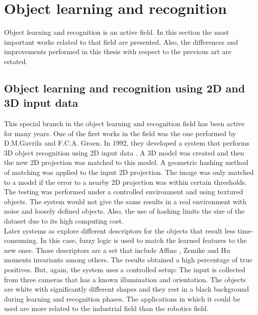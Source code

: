 \section{Object learning and recognition}

Object learning and recognition is an active field. 
In this section the most important works related to that field are presented. 
Also, the differences and improvements performed in this thesis with respect to the previous art are estated. 

\subsection{Object learning and recognition using 2D and 3D input data}

This special branch in the object learning and recognition field has been active for many years. 
One of the first works in the field was the one performed by D.M.Gavrila and F.C.A. Groen. 
In 1992,  they developed a  system that performs 3D object recognition using 2D input data \cite{D.M.Gavrila1991}.
A 3D model was created and then the new 2D projection was matched to this model.
A geometric hashing method of matching was applied to the input 2D projection. 
The image was only matched to a model if the error to a nearby 2D projection was within certain thresholds.
The testing was performed under a controlled environment and using textured objects. 
The system would not give the same results in a real environment with noise and loosely defined objects. 
Also, the use of hashing limits the size of the dataset due to its high computing cost. 
\\

Later systems as \cite{Sheta2012} explore different descriptors for the objects that result less time-consuming. 
In this case, fuzzy logic is used to match the learned features to the new ones. 
Those descriptors are a set that include Affine \cite{Reiss:1991:RFT:117668.117680}, Zemike \cite{Teague} and Hu \cite{Hu1962} moments invariants among others. 
The results obtained a high percentage of true positives. 
But, again, the system uses a controlled setup:
The input is collected from three cameras that has a known illumination and orientation. 
The objects are white with significantly different shapes and they rest in a black background during learning and recognition phases. 
The applications in which it could be used are more related to the industrial field than the robotics field. 
\\

